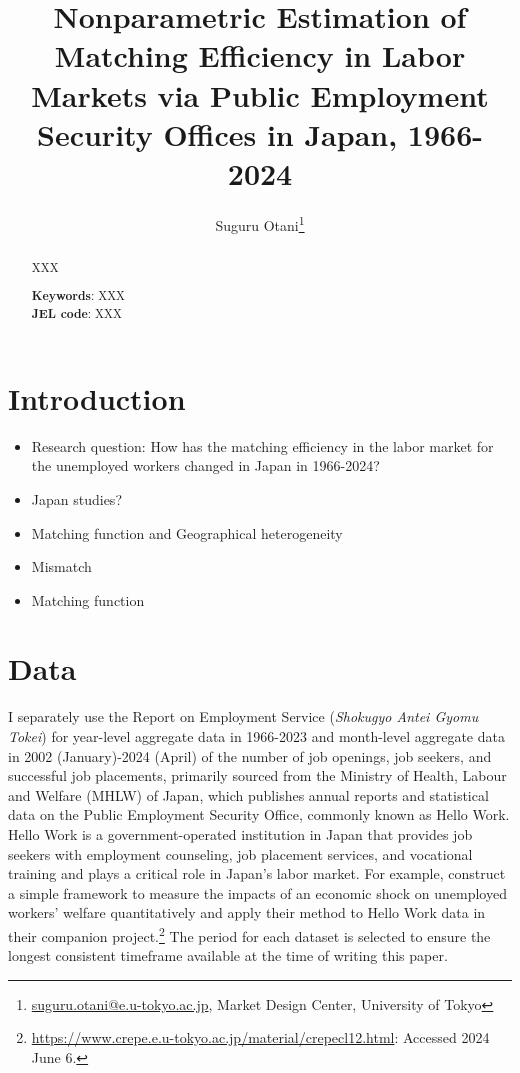 \documentclass[12pt]{article}
\begin{document}
\title{Nonparametric Estimation of Matching Efficiency in Labor Markets via Public Employment Security Offices in Japan, 1966-2024}
\author{Suguru Otani\thanks{\href{mailto:}{suguru.otani@e.u-tokyo.ac.jp}, Market Design Center, University of Tokyo}}
\maketitle

\begin{abstract}
\noindent
XXX

\textbf{Keywords}: XXX \\
\textbf{JEL code}: XXX
\end{abstract}

\section{Introduction}

\begin{itemize}
    \item Research question: How has the matching efficiency in the labor market for the unemployed workers changed in Japan in 1966-2024?
\end{itemize}

\begin{itemize}
    \item Japan studies? \cite{fukai2021describing}
    \item Matching function and Geographical heterogeneity \cite{higashi2018spatial,kano2005estimating}
    \item Mismatch \cite{kawata2019,csahin2014mismatch,kawata2016multi}
    \item Matching function \cite{kambayashi2006vacancy}
\end{itemize}

\section{Data}

I separately use the Report on Employment Service (\textit{Shokugyo Antei Gyomu Tokei}) for year-level aggregate data in 1966-2023 and month-level aggregate data in 2002 (January)-2024 (April) of the number of job openings, job seekers, and successful job placements, primarily sourced from the Ministry of Health, Labour and Welfare (MHLW) of Japan, which publishes annual reports and statistical data on the Public Employment Security Office, commonly known as Hello Work. 
Hello Work is a government-operated institution in Japan that provides job seekers with employment counseling, job placement services, and vocational training and plays a critical role in Japan's labor market.
For example, \cite{kawata2021first} construct a simple framework to measure the impacts of an economic shock on unemployed workers’ welfare quantitatively and apply their method to Hello Work data in their companion project.\footnote{\url{https://www.crepe.e.u-tokyo.ac.jp/material/crepecl12.html}: Accessed 2024 June 6.} 
The period for each dataset is selected to ensure the longest consistent timeframe available at the time of writing this paper.
\end{document}
